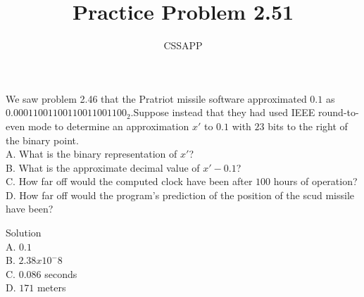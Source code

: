 \documentclass{article}
\title{Practice Problem 2.51}
\author{CSSAPP}
\begin{document}
    \maketitle

    \begin{flushleft}
        We saw problem 2.46 that the Pratriot missile software approximated $0.1$ as
        $0.00011001100110011001100_2$.Suppose instead that they had used IEEE round-to-even mode 
        to determine an approximation $x'$ to $0.1$ with $23$ bits to the right of the binary point.\\
        \bigskip
        A. What is the binary representation of $x'$?\\
        B. What is the approximate decimal value of $x' - 0.1$?\\
        C. How far off would the computed clock have been after $100$ hours of operation?\\
        D. How far off would the program's prediction of the  position of the scud missile have been?

        \bigskip

        Solution\\
        A. $0.1$\\
        B. $2.38 x 10^-8$\\
        C. $0.086$ seconds\\
        D. $171$ meters 

    \end{flushleft}
\end{document}
